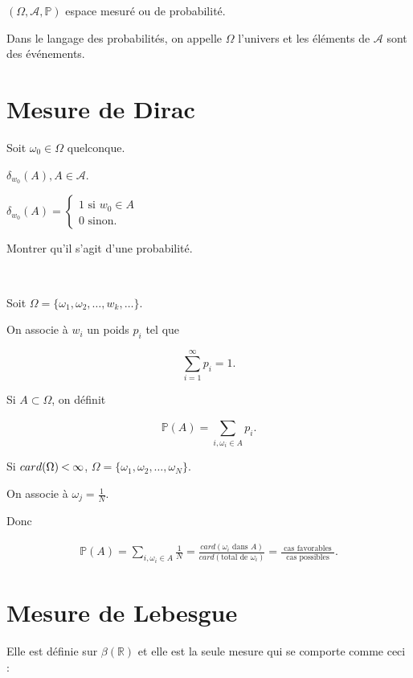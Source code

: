 \documentclass[french]{book}
\theoremstyle{definition}
\theoremstyle{remark}
\newcommand{\lesss}{\rotatebox[origin=c]{90}{$\land$}}
\newcommand{\less}{\ \lesss\ }
\begin{document}
$(\Omega, \mathscr{A}, \mathbb{P} )$ espace mesuré ou de probabilité.

Dans le langage des probabilités, on appelle $\Omega$ l'univers et les éléments de $\mathscr{A} $ sont des événements.

\section{Mesure de Dirac}

Soit $\omega _{0} \in \Omega$ quelconque.

$\delta  _{w_0}(A), A \in \mathscr{A} $.

$\delta _{w_0}(A) =
 \begin{cases}
  1 \text{ si } w_0 \in A \\
  0 \text{ sinon}.
\end{cases}$

Montrer qu'il s'agit d'une probabilité.

\

 Soit $\Omega = \{ \omega_1, \omega_2, \dots, w_k, \dots \} $.

 On associe à $w_i$ un poids $p_i$ tel que

 \begin{equation}
   \sum_{i=1}^{\infty} p_i = 1.
 \end{equation}

 Si $A \subset \Omega$, on définit

 \begin{equation*}
   \mathbb{P}( A ) = \sum_{i,  \omega_i \in A}^{} p_i.
 \end{equation*}

 Si $card(\Omega) \less \infty$, $\Omega = \{ \omega_1, \omega_2, \dots, \omega _{N} \} $.

 On associe à $\omega _{j} = \frac{1}{N}$.

 Donc

 \begin{gather*}
   \mathbb{P}( A ) = \sum_{i, \omega_i \in A}^{} \frac{1}{N} = \frac{card(\omega_i \text{ dans } A)}{card(\text{total de } \omega_i )} = \frac{\text{ cas favorables } }{\text{ cas possibles } }.
 \end{gather*}

\section{Mesure de Lebesgue}

Elle est définie sur $\beta (\mathbb{R})$ et elle est la seule mesure qui se comporte comme ceci :
\end{document}
